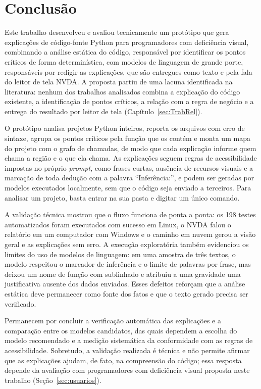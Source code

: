 \documentclass[
    12pt,                   %
    openright,              %
    oneside,                %
    a4paper,                %
    sumario=tradicional,    %
    english,                %
    brazil,                 %
    ]{abntex2}
\begin{document}
\chapter{Conclusão}\label{sec:conclusao}

Este trabalho desenvolveu e avaliou tecnicamente um protótipo que gera explicações de código-fonte Python para programadores com deficiência visual, combinando a análise estática do código, responsável por identificar os pontos críticos de forma determinística, com modelos de linguagem de grande porte, responsáveis por redigir as explicações, que são entregues como texto e pela fala do leitor de tela NVDA. A proposta partiu de uma lacuna identificada na literatura: nenhum dos trabalhos analisados combina a explicação do código existente, a identificação de pontos críticos, a relação com a regra de negócio e a entrega do resultado por leitor de tela (Capítulo~\ref{sec:TrabRel}).

O protótipo analisa projetos Python inteiros, reporta os arquivos com erro de sintaxe, agrupa os pontos críticos pela função que os contém e monta um mapa do projeto com o grafo de chamadas, de modo que cada explicação informe quem chama a região e o que ela chama. As explicações seguem regras de acessibilidade impostas no próprio \textit{prompt}, como frases curtas, ausência de recursos visuais e a marcação de toda dedução com a palavra \enquote{Inferência:}, e podem ser geradas por modelos executados localmente, sem que o código seja enviado a terceiros. Para analisar um projeto, basta entrar na sua pasta e digitar um único comando.

A validação técnica mostrou que o fluxo funciona de ponta a ponta: os 198 testes automatizados foram executados com sucesso em Linux, o NVDA falou o relatório em um computador com Windows e o caminho em nuvem gerou a visão geral e as explicações sem erro. A execução exploratória também evidenciou os limites do uso de modelos de linguagem: em uma amostra de três textos, o modelo respeitou o marcador de inferência e o limite de palavras por frase, mas deixou um nome de função com sublinhado e atribuiu a uma gravidade uma justificativa ausente dos dados enviados. Esses defeitos reforçam que a análise estática deve permanecer como fonte dos fatos e que o texto gerado precisa ser verificado.

Permanecem por concluir a verificação automática das explicações e a comparação entre os modelos candidatos, das quais dependem a escolha do modelo recomendado e a medição sistemática da conformidade com as regras de acessibilidade. Sobretudo, a validação realizada é técnica e não permite afirmar que as explicações ajudam, de fato, na compreensão do código; essa resposta depende da avaliação com programadores com deficiência visual proposta neste trabalho (Seção~\ref{sec:usuarios}).
\end{document}

